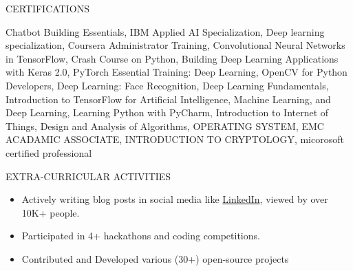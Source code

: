 \documentclass{resume}
\begin{document}
\begin{rSection}{CERTIFICATIONS}

    \begin{itemize}
        Chatbot Building Essentials, IBM Applied AI Specialization, Deep learning specialization,  Coursera Administrator Training,  Convolutional Neural Networks in TensorFlow, Crash Course on Python, Building Deep Learning Applications with Keras 2.0, PyTorch Essential Training: Deep Learning, OpenCV for Python Developers, Deep Learning: Face Recognition, Deep Learning Fundamentals, Introduction to TensorFlow for Artificial Intelligence, Machine Learning, and Deep Learning, Learning Python with PyCharm, Introduction to Internet of Things, Design and Analysis of Algorithms, OPERATING SYSTEM, EMC ACADAMIC ASSOCIATE, INTRODUCTION TO CRYPTOLOGY, micorosoft certified professional
    \end{itemize}
    
    \end{rSection}
    


\begin{rSection}{EXTRA-CURRICULAR ACTIVITIES}

    \begin{itemize}
        \item Actively writing blog posts in social media like \href{https://www.linkedin.com/in/rahul-marban}{LinkedIn}, viewed by over 10K+ people.
        \item Participated in 4+ hackathons and coding competitions.
        \item Contributed and Developed various (30+) open-source projects
    \end{itemize}
    
    \end{rSection}
    
    \vspace{1.5em}

    
    
\end{document}
